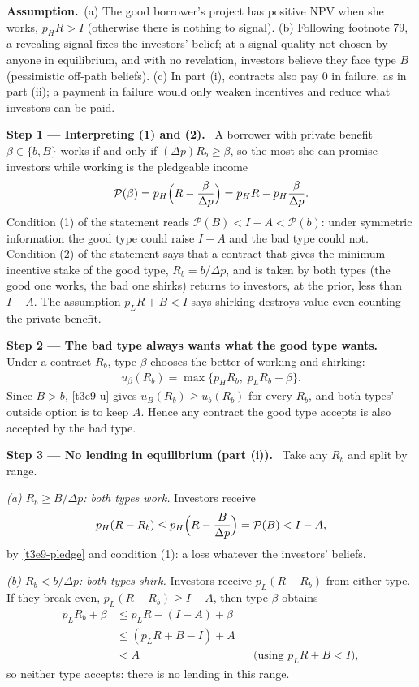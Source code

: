 \documentclass[11pt,a4paper]{article}
\newcommand{\step}[2]{\par\medskip\noindent\textbf{Step #1 --- #2.}~}
\newcommand{\assume}{\par\smallskip\noindent\textbf{Assumption.}~}
\begin{document}
\assume (a) The good borrower's project has positive NPV when she works, $p_HR>I$ (otherwise there is
nothing to signal). (b) Following footnote 79, a revealing signal fixes the investors' belief; at a
signal quality not chosen by anyone in equilibrium, and with no revelation, investors believe they face
type $B$ (pessimistic off-path beliefs). (c) In part (i), contracts also pay $0$ in failure, as in part (ii);
a payment in failure would only weaken incentives and reduce what investors can be paid.

\step{1}{Interpreting (1) and (2)} A borrower with private benefit $\beta\in\{b,B\}$ works if and only if
$(\Delta p)R_b\ge\beta$, so the most she can promise investors while working is the pledgeable income
\begin{align}
  \mathcal{P}(\beta) = p_H\Bigl(R-\frac{\beta}{\Delta p}\Bigr)
     = p_HR - p_H\frac{\beta}{\Delta p}. \label{t3e9-pledge}
\end{align}
Condition (1) of the statement reads $\mathcal{P}(B)<I-A<\mathcal{P}(b)$: under symmetric information the
good type could raise $I-A$ and the bad type could not. Condition (2) of the statement says that a
contract that gives the minimum incentive stake of the good type, $R_b=b/\Delta p$, and is taken by both
types (the good one works, the bad one shirks) returns to investors, at the prior, less than $I-A$.
The assumption $p_LR+B<I$ says shirking destroys value even counting the private benefit.

\step{2}{The bad type always wants what the good type wants} Under a contract $R_b$, type $\beta$
chooses the better of working and shirking:
\begin{align}
  u_\beta(R_b) = \max\{p_HR_b,\; p_LR_b+\beta\}. \label{t3e9-u}
\end{align}
Since $B>b$, \eqref{t3e9-u} gives $u_B(R_b)\ge u_b(R_b)$ for every $R_b$, and both types' outside option is
to keep $A$. Hence any contract the good type accepts is also accepted by the bad type.

\step{3}{No lending in equilibrium (part (i))} Take any $R_b$ and split by range.

\emph{(a) $R_b\ge B/\Delta p$: both types work.} Investors receive
\begin{align}
  p_H(R-R_b) \le p_H\Bigl(R-\frac{B}{\Delta p}\Bigr)=\mathcal{P}(B) < I-A, \nonumber
\end{align}
by \eqref{t3e9-pledge} and condition (1): a loss whatever the investors' beliefs.

\emph{(b) $R_b<b/\Delta p$: both types shirk.} Investors receive $p_L(R-R_b)$ from either type. If they
break even, $p_L(R-R_b)\ge I-A$, then type $\beta$ obtains
\begin{align}
  p_LR_b+\beta &\le p_LR-(I-A)+\beta \nonumber\\
  &\le (p_LR+B-I)+A \nonumber\\
  &< A && \text{(using } p_LR+B<I), \nonumber
\end{align}
so neither type accepts: there is no lending in this range.
\end{document}

